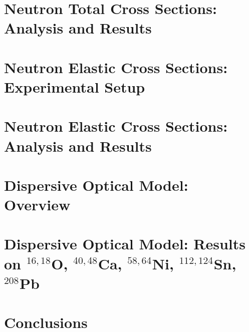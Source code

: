 \documentclass[twosided, 12pt]{book} %
\newcommand{\oSixEight}{\ensuremath{^{16,18}}O}
\newcommand{\caAughtEight}{\ensuremath{^{40,48}}Ca}
\newcommand{\niEightFour}{\ensuremath{^{58,64}}Ni}
\newcommand{\snTwelveFour}{\ensuremath{^{112,124}}Sn}
\newcommand{\pbEight}{\ensuremath{^{208}}Pb}
\newcommand{\textDirectory}{text}
\begin{document}
\chapter{Neutron Total Cross Sections: Analysis and Results} \label{TCSAnalysis}


\chapter{Neutron Elastic Cross Sections: Experimental Setup} \label{ECSExperiment}


\chapter{Neutron Elastic Cross Sections: Analysis and Results} \label{ECSAnalysis}
%

\chapter{Dispersive Optical Model: Overview} \label{DOMFormalism}
%

\chapter{Dispersive Optical Model: Results on \oSixEight, \caAughtEight,
\niEightFour, \snTwelveFour, \pbEight}\label{DOMResults}
%

\chapter{Conclusions}
%

\clearpage %

\fancyhead{} %
\fancyhead[LE]{\MakeUppercase{ \leftmark}} %

\clearpage
{}

\singlespacing


\doublespacing

\clearpage
\end{document}

